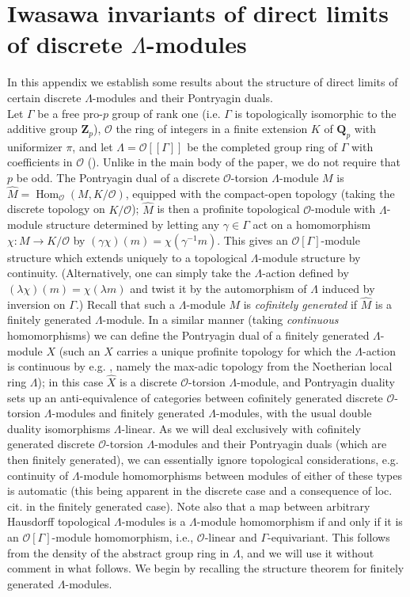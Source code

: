 \documentclass[12 pt]{amsart}
\theoremstyle{plain}
\theoremstyle{definition}
\numberwithin{equation}{section}
\numberwithin{table}{section}
\begin{document}
\section{Iwasawa invariants of direct limits of discrete $\Lambda$-modules}
\label{app-a}
\indent In this appendix we establish some results about the structure of direct limits of certain discrete $\Lambda$-modules and their Pontryagin duals.\\%
\indent Let $\Gamma$ be a free pro-$p$ group of rank one (i.e. $\Gamma$ is topologically isomorphic to the additive group $\mathbf{Z}_p$), $\mathscr{O}$ the ring of integers in a finite extension $K$ of $\mathbf{Q}_p$ with uniformizer $\pi$, and let $\Lambda=\mathscr{O}[[\Gamma]]$ be the completed group ring of $\Gamma$ with coefficients in $\mathscr{O}$ (\cite[Definition 5.2.1]{NSW}). Unlike in the main body of the paper, we do not require that $p$ be odd. The Pontryagin dual of a discrete $\mathscr{O}$-torsion $\Lambda$-module $M$ is $\widehat{M}=\operatorname{Hom}_\mathscr{O}(M,K/\mathscr{O})$, equipped with the compact-open topology (taking the discrete topology on $K/\mathscr{O}$); $\widehat{M}$ is then a profinite topological $\mathscr{O}$-module with $\Lambda$-module structure determined by letting any $\gamma\in\Gamma$ act on a homomorphism $\chi:M\to K/\mathscr{O}$ by $(\gamma\chi)(m)=\chi(\gamma^{-1}m)$. This gives an $\mathscr{O}[\Gamma]$-module structure which extends uniquely to a topological $\Lambda$-module structure by continuity. (Alternatively, one can simply take the $\Lambda$-action defined by $(\lambda\chi)(m)=\chi(\lambda m)$ and twist it by the automorphism of $\Lambda$ induced by inversion on $\Gamma$.) Recall that such a $\Lambda$-module $M$ is \emph{cofinitely generated} if $\widehat{M}$ is a finitely generated $\Lambda$-module. In a similar manner (taking \emph{continuous} homomorphisms) we can define the Pontryagin dual of a finitely generated $\Lambda$-module $X$ (such an $X$ carries a unique profinite topology for which the $\Lambda$-action is continuous by e.g. \cite[Proposition 5.2.23]{NSW}, namely the max-adic topology from the Noetherian local ring $\Lambda$); in this case $\widehat{X}$ is a discrete $\mathscr{O}$-torsion $\Lambda$-module, and Pontryagin duality sets up an anti-equivalence of categories between cofinitely generated discrete $\mathscr{O}$-torsion $\Lambda$-modules and finitely generated $\Lambda$-modules, with the usual double duality isomorphisms $\Lambda$-linear. As we will deal exclusively with cofinitely generated discrete $\mathscr{O}$-torsion $\Lambda$-modules and their Pontryagin duals (which are then finitely generated), we can essentially ignore topological considerations, e.g. continuity of $\Lambda$-module homomorphisms between modules of either of these types is automatic (this being apparent in the discrete case and a consequence of loc. cit. in the finitely generated case). Note also that a map between arbitrary Hausdorff topological $\Lambda$-modules is a $\Lambda$-module homomorphism if and only if it is an $\mathscr{O}[\Gamma]$-module homomorphism, i.e., $\mathscr{O}$-linear and $\Gamma$-equivariant. This follows from the density of the abstract group ring in $\Lambda$, and we will use it without comment in what follows. We begin by recalling the structure theorem for finitely generated $\Lambda$-modules. 
\end{document}
